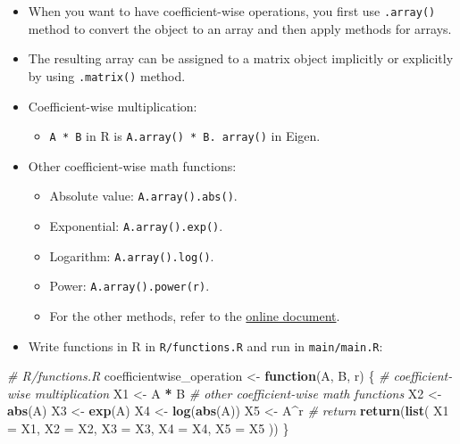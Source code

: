 \documentclass[]{book}
\newenvironment{Shaded}{\begin{snugshade}}{\end{snugshade}}
\newcommand{\KeywordTok}[1]{\textcolor[rgb]{0.13,0.29,0.53}{\textbf{#1}}}
\newcommand{\DataTypeTok}[1]{\textcolor[rgb]{0.13,0.29,0.53}{#1}}
\newcommand{\StringTok}[1]{\textcolor[rgb]{0.31,0.60,0.02}{#1}}
\newcommand{\CommentTok}[1]{\textcolor[rgb]{0.56,0.35,0.01}{\textit{#1}}}
\newcommand{\ControlFlowTok}[1]{\textcolor[rgb]{0.13,0.29,0.53}{\textbf{#1}}}
\newcommand{\OperatorTok}[1]{\textcolor[rgb]{0.81,0.36,0.00}{\textbf{#1}}}
\newcommand{\NormalTok}[1]{#1}
\providecommand{\tightlist}{%
  \setlength{\itemsep}{0pt}\setlength{\parskip}{0pt}}
\begin{document}
\begin{itemize}
\item
  When you want to have coefficient-wise operations, you first use
  \texttt{.array()} method to convert the object to an array and then
  apply methods for arrays.
\item
  The resulting array can be assigned to a matrix object implicitly or
  explicitly by using \texttt{.matrix()} method.
\item
  Coefficient-wise multiplication:

  \begin{itemize}
  \tightlist
  \item
    \texttt{A\ *\ B} in R is \texttt{A.array()\ *\ B.\ array()} in
    Eigen.
  \end{itemize}
\item
  Other coefficient-wise math functions:

  \begin{itemize}
  \tightlist
  \item
    Absolute value: \texttt{A.array().abs()}.
  \item
    Exponential: \texttt{A.array().exp()}.
  \item
    Logarithm: \texttt{A.array().log()}.
  \item
    Power: \texttt{A.array().power(r)}.
  \item
    For the other methods, refer to the
    \href{https://eigen.tuxfamily.org/dox/group__CoeffwiseMathFunctions.html}{online
    document}.
  \end{itemize}
\item
  Write functions in R in \texttt{R/functions.R} and run in
  \texttt{main/main.R}:
\end{itemize}

\begin{Shaded}
\begin{Highlighting}[]
\CommentTok{# R/functions.R}
\NormalTok{coefficientwise_operation <-}
\StringTok{  }\ControlFlowTok{function}\NormalTok{(A, B, r) \{}
    \CommentTok{# coefficient-wise multiplication}
\NormalTok{    X1 <-}\StringTok{ }\NormalTok{A }\OperatorTok{*}\StringTok{ }\NormalTok{B}
    \CommentTok{# other coefficient-wise math functions}
\NormalTok{    X2 <-}\StringTok{ }\KeywordTok{abs}\NormalTok{(A)}
\NormalTok{    X3 <-}\StringTok{ }\KeywordTok{exp}\NormalTok{(A)}
\NormalTok{    X4 <-}\StringTok{ }\KeywordTok{log}\NormalTok{(}\KeywordTok{abs}\NormalTok{(A))}
\NormalTok{    X5 <-}\StringTok{ }\NormalTok{A}\OperatorTok{^}\NormalTok{r}
    \CommentTok{# return}
    \KeywordTok{return}\NormalTok{(}\KeywordTok{list}\NormalTok{(}
      \DataTypeTok{X1 =}\NormalTok{ X1,}
      \DataTypeTok{X2 =}\NormalTok{ X2,}
      \DataTypeTok{X3 =}\NormalTok{ X3,}
      \DataTypeTok{X4 =}\NormalTok{ X4,}
      \DataTypeTok{X5 =}\NormalTok{ X5}
\NormalTok{    ))}
\NormalTok{  \}}
\end{Highlighting}
\end{Shaded}
\end{document}
